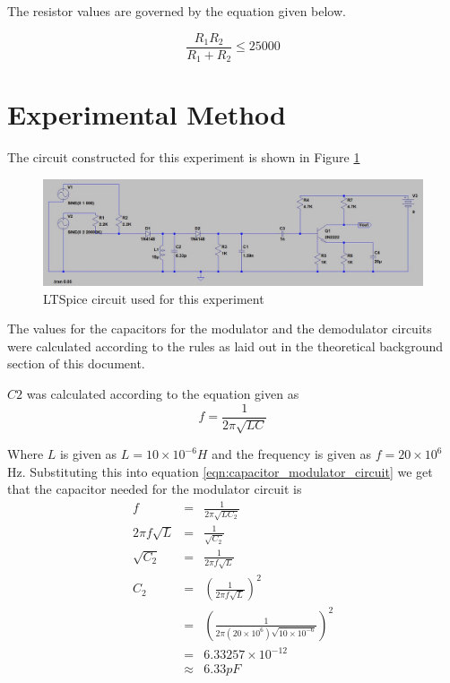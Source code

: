 \documentclass[12pt, a4paper]{article}
\begin{document}
 	The resistor values are governed by the equation given below.

 	\[
 		\frac{R_1R_2}{R_1+R_2} \le 25000
 	\]



\section{Experimental Method} %
\label{sec:experimental_method}
	The circuit constructed for this experiment is shown in Figure \ref{fig:circuit_1}
	\begin{figure}[H]
		\centering
		\includegraphics[width=\textwidth]{images/Circuit_2.JPG}
		\caption{LTSpice circuit used for this experiment}
		\label{fig:circuit_1}
	\end{figure}

	The values for the capacitors for the modulator and the demodulator circuits were calculated according to the rules as laid out in the theoretical background section of this document.

	$C2$ was calculated according to the equation given as 
	\begin{equation}
		f =  \frac{1}{2\pi\sqrt{LC}} 
		\label{eqn:capacitor_modulator_circuit}
	\end{equation}

	Where $L$ is given as $L = 10\times10^{-6}H$ and the frequency is given as $f= 20\times 10^6 $Hz. Substituting this into equation \ref{eqn:capacitor_modulator_circuit} we get that the capacitor needed for the modulator circuit is
	\[
		\begin{array}{rcl}
			f & = & \frac{1}{2\pi\sqrt{LC_2}} \\
			2\pi f \sqrt{L} & = & \frac{1}{\sqrt{C_2}} \\
			\sqrt{C_2} & = & \frac{1}{2\pi f \sqrt{L}} \\
			C_2 & = & \left(\frac{1}{2\pi f \sqrt{L}}\right)^2 \\
			& = & \left(\frac{1}{2\pi(20\times 10^6)\sqrt{10\times 10^{-6}}}\right)^2 \\
			& = & 6.33257 \times 10^{-12} \\
			& \approx & 6.33 pF 
		\end{array}
	\]
	
\end{document}
